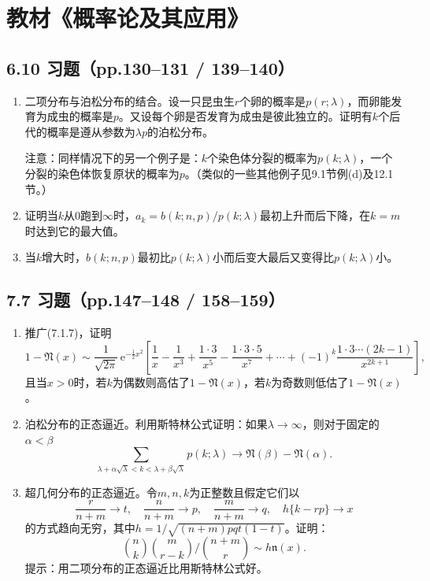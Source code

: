 \documentclass[UTF8]{ctexart}
\begin{document}
\section*{教材《概率论及其应用》}

\subsection*{6.10 习题（pp.130--131 / 139--140）}

\begin{enumerate}
\renewcommand{\labelenumi}{\textbf{\arabic{enumi}.}}
\setcounter{enumi}{26}
\item 二项分布与泊松分布的结合。设一只昆虫生$r$个卵的概率是$p(r;\lambda)$，而卵能发育为成虫的概率是$p$。又设每个卵是否发育为成虫是彼此独立的。证明有$k$个后代的概率是遵从参数为$\lambda p$的泊松分布。

注意：同样情况下的另一个例子是：$k$个染色体分裂的概率为$p(k;\lambda)$，一个分裂的染色体恢复原状的概率为$p$。（类似的一些其他例子见9.1节例(d)及12.1节。）

\setcounter{enumi}{29}
\item 证明当$k$从0跑到$\infty$时，$a_{k}=b(k;n,p)/p(k;\lambda)$最初上升而后下降，在$k=m$时达到它的最大值。

\item 当$k$增大时，$b(k;n,p)$最初比$p(k;\lambda)$小而后变大最后又变得比$p(k;\lambda)$小。
\end{enumerate}

\subsection*{7.7 习题（pp.147--148 / 158--159）}

\begin{enumerate}
\renewcommand{\labelenumi}{\textbf{\arabic{enumi}.}}
\item 推广(7.1.7)，证明
\[
1-\mathfrak{N}(x)\sim\frac{1}{\sqrt{2\pi}}\,\mathrm{e}^{-\frac{1}{2}x^{2}}\left[\frac{1}{x}-\frac{1}{x^{3}}+\frac{1\cdot 3}{x^{5}}-\frac{1\cdot 3\cdot 5}{x^{7}}+\cdots+(-1)^{k}\frac{1\cdot 3\cdots(2k-1)}{x^{2k+1}}\right],
\]
且当$x>0$时，若$k$为偶数则高估了$1-\mathfrak{N}(x)$，若$k$为奇数则低估了$1-\mathfrak{N}(x)$。

\setcounter{enumi}{8}
\item 泊松分布的正态逼近。利用斯特林公式证明：如果$\lambda\to\infty$，则对于固定的$\alpha<\beta$
\[
\sum_{\lambda+\alpha\sqrt{\lambda}<k<\lambda+\beta\sqrt{\lambda}}p(k;\lambda)\to\mathfrak{N}(\beta)-\mathfrak{N}(\alpha).
\]

\item 超几何分布的正态逼近。令$m,n,k$为正整数且假定它们以
\[
\frac{r}{n+m}\to t,\quad \frac{n}{n+m}\to p,\quad \frac{m}{n+m}\to q,\quad h\{k-rp\}\to x
\]
的方式趋向无穷，其中$h=1/\sqrt{(n+m)pqt(1-t)}$。证明：
\[
\binom{n}{k}\binom{m}{r-k}\Big/\binom{n+m}{r}\sim h\mathfrak{n}(x).
\]
提示：用二项分布的正态逼近比用斯特林公式好。
\end{enumerate}
\end{document}
